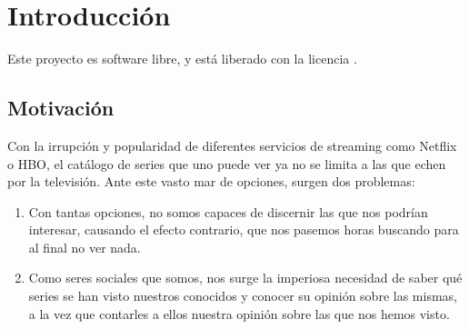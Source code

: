 \chapter{Introducción}

Este proyecto es software libre, y está liberado con la licencia \cite{gplv3}.

\section{Motivación}
Con la irrupción y popularidad de diferentes servicios de streaming como Netflix o HBO, el catálogo de series que uno puede ver ya no se limita a las que echen por la televisión. Ante este vasto mar de opciones, surgen dos problemas:
\begin{enumerate}
    \item Con tantas opciones, no somos capaces de discernir las que nos podrían interesar, causando el efecto contrario, que nos pasemos horas buscando para al final no ver nada.
    \item Como seres sociales que somos, nos surge la imperiosa necesidad de saber qué series se han visto nuestros conocidos y conocer su opinión sobre las mismas, a la vez que contarles a ellos nuestra opinión sobre las que nos hemos visto.
\end{enumerate}

